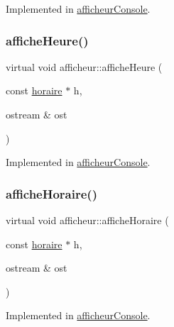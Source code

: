 Implemented in \hyperlink{classafficheur_console_aa77bdd8065edd5269f83679490e78dee}{afficheur\+Console}.

\hypertarget{classafficheur_a3c3ace0f2f01e95a1cc86a0b6c497e34}{}\label{classafficheur_a3c3ace0f2f01e95a1cc86a0b6c497e34} 
\subsubsection{\texorpdfstring{affiche\+Heure()}{afficheHeure()}}
{\footnotesize\ttfamily virtual void afficheur\+::affiche\+Heure (\begin{DoxyParamCaption}\item[{const \hyperlink{classhoraire}{horaire} $\ast$}]{h,  }\item[{ostream \&}]{ost }\end{DoxyParamCaption})\hspace{0.3cm}{\ttfamily [pure virtual]}}



Implemented in \hyperlink{classafficheur_console_a842884a9553df737f781d2f8f040d30e}{afficheur\+Console}.

\hypertarget{classafficheur_aa598626f11775b4c610b8f262017cad7}{}\label{classafficheur_aa598626f11775b4c610b8f262017cad7} 
\subsubsection{\texorpdfstring{affiche\+Horaire()}{afficheHoraire()}}
{\footnotesize\ttfamily virtual void afficheur\+::affiche\+Horaire (\begin{DoxyParamCaption}\item[{const \hyperlink{classhoraire}{horaire} $\ast$}]{h,  }\item[{ostream \&}]{ost }\end{DoxyParamCaption})\hspace{0.3cm}{\ttfamily [pure virtual]}}



Implemented in \hyperlink{classafficheur_console_a44e40b275c8b0b1a33cdc5bd46a31cf3}{afficheur\+Console}.

\hypertarget{classafficheur_a0cea335dad556ceba3487ae261b831f9}{}\label{classafficheur_a0cea335dad556ceba3487ae261b831f9} 
